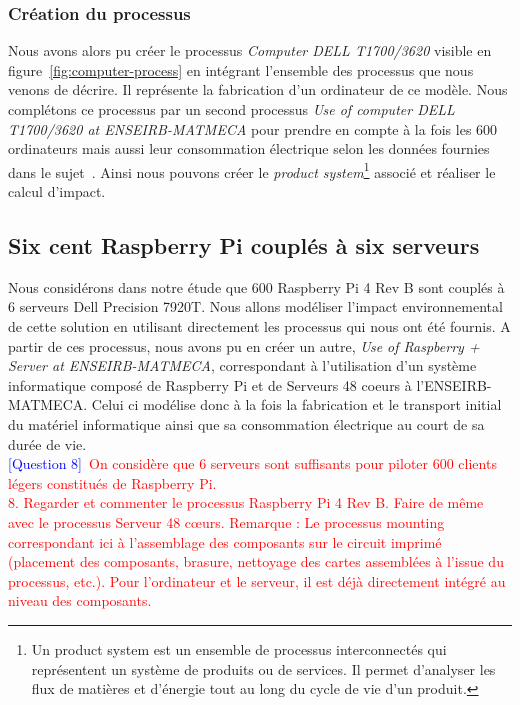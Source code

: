 \documentclass[12pt,a4paper]{paper}
\begin{document}
\subsubsection{Création du processus}
Nous avons alors pu créer le processus \textit{Computer DELL T1700/3620} visible en figure~\ref{fig:computer-process} en intégrant l'ensemble des processus que nous venons de décrire. Il représente la fabrication d'un ordinateur de ce modèle. Nous complétons ce processus par un second processus \textit{Use of computer DELL T1700/3620 at ENSEIRB-MATMECA} pour prendre en compte à la fois les 600 ordinateurs mais aussi leur consommation électrique selon les données fournies dans le sujet~\cite{TP2_ACV_ENSEIRB-MATMECA}. Ainsi nous pouvons créer le \textit{product system}\footnote{Un product system est un ensemble de processus interconnectés qui représentent un système de produits ou de services. Il permet d'analyser les flux de matières et d'énergie tout au long du cycle de vie d'un produit.} associé et réaliser le calcul d'impact.

\subsection{Six cent Raspberry Pi couplés à six serveurs}
Nous considérons dans notre étude que 600 Raspberry Pi 4 Rev B sont couplés à 6 serveurs Dell Precision 7920T. Nous allons modéliser l'impact environnemental de cette solution en utilisant directement les processus qui nous ont été fournis. A partir de ces processus, nous avons pu en créer un autre, \textit{Use of Raspberry + Server at ENSEIRB-MATMECA}, correspondant à l'utilisation d'un système informatique composé de Raspberry Pi et de Serveurs 48 coeurs à l'ENSEIRB-MATMECA. Celui ci modélise donc à la fois la fabrication et le transport initial du matériel informatique ainsi que sa consommation électrique au court de sa durée de vie.\\
\textcolor{blue}{[Question 8]}~\textcolor{red}{On considère que 6 serveurs sont suffisants pour piloter 600 clients légers constitués de Raspberry Pi.\\ 8. Regarder et commenter le processus Raspberry Pi 4 Rev B. Faire de même avec le processus Serveur 48 cœurs. Remarque : Le processus mounting correspondant ici à l’assemblage des composants sur le circuit imprimé (placement des composants, brasure, nettoyage des cartes assemblées à l’issue du processus, etc.). Pour l’ordinateur et le serveur, il est déjà directement intégré au niveau des composants.}
\end{document}

